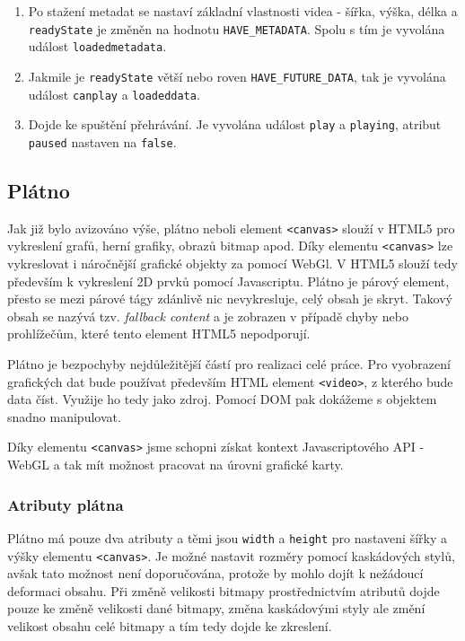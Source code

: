 \begin{description}
\begin{enumerate}
			\item Po stažení metadat se nastaví základní vlastnosti videa - šířka, výška, délka a \texttt{readyState} je změněn na hodnotu \texttt{HAVE\_METADATA}. Spolu s tím je vyvolána událost \texttt{loadedmetadata}.
			
			\item Jakmile je \texttt{readyState} větší nebo roven \texttt{HAVE\_FUTURE\_DATA}, tak je vyvolána událost \texttt{canplay} a \texttt{loadeddata}.
			
			\item Dojde ke spuštění přehrávání. Je vyvolána událost \texttt{play} a \texttt{playing}, atribut \texttt{paused} nastaven na \texttt{false}.
		\end{enumerate}
\end{description}


\newpage

\subsection{Plátno}

Jak již bylo avizováno výše, plátno neboli element \texttt{<canvas>} slouží v HTML5 pro vykreslení grafů, herní grafiky, obrazů bitmap apod. Díky elementu \texttt{<canvas>} lze vykreslovat i náročnější grafické objekty za pomocí WebGl. V HTML5 slouží tedy především k vykreslení 2D prvků pomocí Javascriptu. Plátno je párový  element, přesto se mezi párové tágy zdánlivě nic nevykresluje, celý obsah je skryt. Takový obsah se nazývá tzv. \textit{fallback content} a je zobrazen v případě chyby nebo prohlížečům, které tento element HTML5 nepodporují.

Plátno je bezpochyby nejdůležitější částí pro realizaci celé práce. Pro  vyobrazení grafických dat bude používat především HTML element \texttt{<video>}, z kterého bude data číst. Využije ho tedy jako zdroj. Pomocí DOM pak dokážeme s objektem snadno manipulovat. 

Díky elementu \texttt{<canvas>} jsme schopni získat kontext Javascriptového API - WebGL a tak mít možnost  pracovat na úrovni grafické karty.


\subsubsection*{Atributy plátna}
Plátno má pouze dva atributy a těmi jsou \texttt{width} a \texttt{height} pro nastaveni šířky a výšky elementu \texttt{<canvas>}. Je možné nastavit rozměry pomocí kaskádových stylů, avšak tato možnost není doporučována, protože by mohlo dojít k nežádoucí deformaci obsahu. Při změně velikosti bitmapy prostřednictvím atributů dojde pouze ke změně velikosti dané bitmapy, změna kaskádovými styly ale změní velikost obsahu celé bitmapy a tím tedy dojde ke zkreslení.


